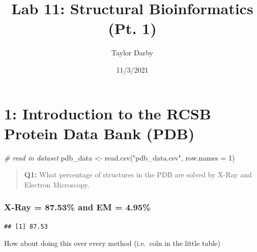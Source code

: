 \documentclass[
]{article}
\title{Lab 11: Structural Bioinformatics (Pt. 1)}
\author{Taylor Darby}
\date{11/3/2021}
\newenvironment{Shaded}{\begin{snugshade}}{\end{snugshade}}
\newcommand{\AttributeTok}[1]{\textcolor[rgb]{0.77,0.63,0.00}{#1}}
\newcommand{\CommentTok}[1]{\textcolor[rgb]{0.56,0.35,0.01}{\textit{#1}}}
\newcommand{\DecValTok}[1]{\textcolor[rgb]{0.00,0.00,0.81}{#1}}
\newcommand{\FunctionTok}[1]{\textcolor[rgb]{0.00,0.00,0.00}{#1}}
\newcommand{\NormalTok}[1]{#1}
\newcommand{\OtherTok}[1]{\textcolor[rgb]{0.56,0.35,0.01}{#1}}
\newcommand{\SpecialCharTok}[1]{\textcolor[rgb]{0.00,0.00,0.00}{#1}}
\newcommand{\StringTok}[1]{\textcolor[rgb]{0.31,0.60,0.02}{#1}}
\begin{document}
\maketitle

\hypertarget{introduction-to-the-rcsb-protein-data-bank-pdb}{%
\section{1: Introduction to the RCSB Protein Data Bank
(PDB)}\label{introduction-to-the-rcsb-protein-data-bank-pdb}}

\begin{Shaded}
\begin{Highlighting}[]
\CommentTok{\# read in dataset}
\NormalTok{pdb\_data }\OtherTok{\textless{}{-}} \FunctionTok{read.csv}\NormalTok{(}\StringTok{"pdb\_data.csv"}\NormalTok{, }\AttributeTok{row.names =} \DecValTok{1}\NormalTok{)}
\end{Highlighting}
\end{Shaded}

\begin{quote}
\textbf{Q1:} What percentage of structures in the PDB are solved by
X-Ray and Electron Microscopy.
\end{quote}

\hypertarget{x-ray-87.53-and-em-4.95}{%
\subsubsection{X-Ray = 87.53\% and EM =
4.95\%}\label{x-ray-87.53-and-em-4.95}}

\begin{Shaded}
\end{Shaded}

\begin{verbatim}
## [1] 87.53
\end{verbatim}

How about doing this over every method (i.e.~coln in the little table)

\begin{Shaded}
\end{Shaded}
\end{document}
